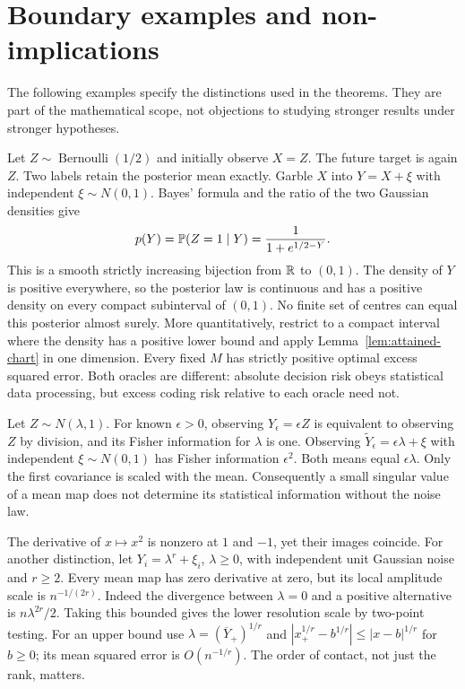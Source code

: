\section{Boundary examples and non-implications}\label{sec:boundaries}
The following examples specify the distinctions used in the theorems. They
are part of the mathematical scope, not objections to studying stronger
results under stronger hypotheses.

\begin{example}
\label{ex:bit-gaussian}
Let $Z\sim\operatorname{Bernoulli}(1/2)$ and initially observe $X=Z$.
The future target is again $Z$. Two labels retain the posterior mean exactly.
Garble $X$ into $Y=X+\xi$ with independent $\xi\sim N(0,1)$. Bayes' formula
and the ratio of the two Gaussian densities give
\[
 p(Y)=\mathbb P(Z=1\mid Y)=\frac1{1+e^{1/2-Y}}.
\]
This is a smooth strictly increasing bijection from $\mathbb R$ to $(0,1)$.
The density of $Y$ is positive everywhere, so the posterior law is
continuous and has a positive density on every compact subinterval of
$(0,1)$. No finite set of centres can equal this posterior almost surely.
More quantitatively, restrict to a compact interval where the density has
a positive lower bound and apply Lemma~\ref{lem:attained-chart} in one
dimension. Every fixed $M$ has strictly positive optimal excess squared
error. Both oracles are different: absolute decision risk obeys statistical
data processing, but excess coding risk relative to each oracle need not.
\end{example}

\begin{example}
Let $Z\sim N(\lambda,1)$. For known $\epsilon>0$, observing
$Y_\epsilon=\epsilon Z$ is equivalent to observing $Z$ by division, and
its Fisher information for $\lambda$ is one. Observing
$\widetilde Y_\epsilon=\epsilon\lambda+\xi$ with independent
$\xi\sim N(0,1)$ has Fisher information $\epsilon^2$. Both means equal
$\epsilon\lambda$. Only the first covariance is scaled with the mean.
Consequently a small singular value of a mean map does not determine its
statistical information without the noise law.
\end{example}

\begin{example}
The derivative of $x\mapsto x^2$ is nonzero at $1$ and $-1$, yet their
images coincide. For another distinction, let $Y_i=\lambda^r+\xi_i$,
$\lambda\ge0$, with independent unit Gaussian noise and $r\ge2$. Every
mean map has zero derivative at zero, but its local amplitude scale is
$n^{-1/(2r)}$. Indeed the divergence between $\lambda=0$ and a positive
alternative is $n\lambda^{2r}/2$. Taking this bounded gives the lower
resolution scale by two-point testing. For an upper bound use
$\widehat\lambda=(\overline Y_+)^{1/r}$ and
$|x_+^{1/r}-b^{1/r}|\le|x-b|^{1/r}$ for $b\ge0$; its mean squared
error is $O(n^{-1/r})$. The order of contact, not just the rank, matters.
\end{example}

